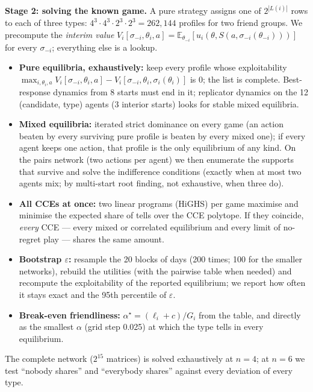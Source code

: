 \documentclass[conference]{IEEEtran}
\theoremstyle{plain}
\theoremstyle{definition}\newtheorem{definition}{Definition}
\newcommand{\E}{\mathbb{E}}\newcommand{\1}{\mathbf{1}}
\begin{document}
\textbf{Stage 2: solving the known game.} A pure strategy assigns one of $2^{|L(i)|}$ rows to each of three types: $4^3\cdot4^3\cdot2^3\cdot2^3=262{,}144$ profiles for two friend groups.
We precompute the \emph{interim value} $V_i[\sigma_{-i},\theta_i,a]=\E_{\theta_{-i}}[u_i(\theta,S(a,\sigma_{-i}(\theta_{-i})))]$ for every $\sigma_{-i}$; everything else is a lookup.
\begin{itemize}
\item \textbf{Pure equilibria, exhaustively:} keep every profile whose exploitability $\max_{i,\theta_i,a}V_i[\sigma_{-i},\theta_i,a]-V_i[\sigma_{-i},\theta_i,\sigma_i(\theta_i)]$ is 0; the list is complete.
Best-response dynamics from 8 starts must end in it; replicator dynamics on the 12 (candidate, type) agents (3 interior starts) looks for stable mixed equilibria.
\item \textbf{Mixed equilibria:} iterated strict dominance on every game (an action beaten by every surviving pure profile is beaten by every mixed one); if every agent keeps one action, that profile is the only
equilibrium of any kind. On the pairs network (two actions per agent) we then enumerate the supports that survive and solve the indifference conditions (exactly when at most two agents mix; by multi-start root finding, not exhaustive, when three do).
\item \textbf{All CCEs at once:} two linear programs (HiGHS) per game maximise and minimise the expected share of tells over the CCE polytope. If they coincide, \emph{every} CCE --- every mixed or correlated equilibrium and every limit of no-regret play --- shares the same amount.
\item \textbf{Bootstrap $\varepsilon$:} resample the 20 blocks of days (200 times; 100 for the smaller networks), rebuild the utilities (with the pairwise table when needed) and recompute the exploitability of the reported equilibrium; we report how often it stays exact and the 95th percentile of $\varepsilon$.
\item \textbf{Break-even friendliness:} $\alpha^\star=(\ell_i+c)/G_i$ from the table, and directly as the smallest $\alpha$ (grid step 0.025) at which the type tells in every equilibrium.
\end{itemize}
The complete network ($2^{15}$ matrices) is solved exhaustively at $n=4$; at $n=6$ we test ``nobody shares'' and ``everybody shares'' against every deviation of every type.
\end{document}
